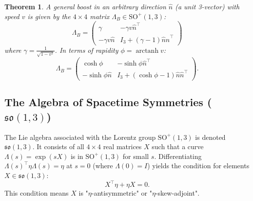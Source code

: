 \documentclass{amsart}
\newtheorem{theorem}{Theorem}[section]
\theoremstyle{definition}
\theoremstyle{remark}
\DeclareMathOperator{\arctanh}{arctanh}
\begin{document}
\begin{theorem}\label{thm:general_boost_so13}
  A general boost in an arbitrary direction $\hat{n}$ (a unit 3-vector) with speed $v$ is given by the $4 \times 4$ matrix $\Lambda_B \in \mathrm{SO}^+(1,3)$:
  \begin{equation*}
    \Lambda_B =
    \begin{pmatrix}
      \gamma & -\gamma v \hat{n}^\top \\
      -\gamma v \hat{n} & I_3 + \left(\gamma-1\right)\hat{n}\hat{n}^\top
    \end{pmatrix}
  \end{equation*}
  where $\gamma=\frac{1}{\sqrt{1-v^2}}$. In terms of rapidity $\phi=\arctanh v$:
  \begin{equation*}
    \Lambda_B =
    \begin{pmatrix}
      \cosh \phi & -\sinh \phi \hat{n}^\top \\
      -\sinh \phi \hat{n} & I_3 + (\cosh \phi - 1) \hat{n} \hat{n}^\top
    \end{pmatrix}.
  \end{equation*}
\end{theorem}

\subsection{The Algebra of Spacetime Symmetries ($\mathfrak{so}(1,3)$)}
\label{subsec:so13_algebra}
The Lie algebra associated with the Lorentz group $\mathrm{SO}^+(1,3)$ is denoted $\mathfrak{so}(1,3)$.
It consists of all \(4 \times 4\) real matrices \(X\) such that a curve $\Lambda(s) = \exp(sX)$ is in $\mathrm{SO}^+(1,3)$ for small $s$.
Differentiating $\Lambda(s)^\top \eta \Lambda(s) = \eta$ at $s=0$ (where $\Lambda(0)=I$) yields the condition for elements $X \in \mathfrak{so}(1,3)$:
\begin{equation*}
  X^\top \eta + \eta X = 0.
\end{equation*}
This condition means $X$ is "$\eta$-antisymmetric" or "$\eta$-skew-adjoint".
\end{document}
